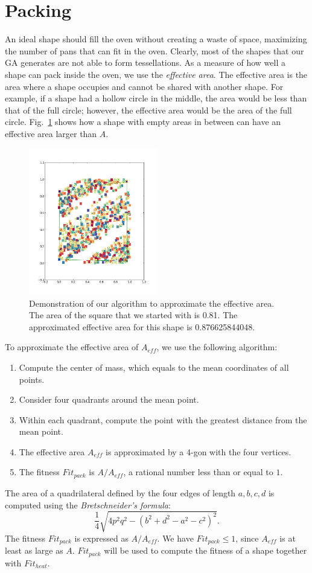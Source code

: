 \documentclass[12pt]{reedmcm}
\begin{document}
\section{Packing}
\label{sec:packing}
An ideal shape should fill the oven without creating a waste of space, maximizing the number of pans that can fit in the oven.
Clearly, most of the shapes that our GA generates are not able to form tessellations.
As a measure of how well a shape can pack inside the oven, we use the \textit{effective area}.
The effective area is the area where a shape occupies and cannot be shared with another shape.
For example, if a shape had a hollow circle in the middle, the area would be less than that of the full circle; however, the effective area would be the area of the full circle.
Fig.~\ref{fig:effarea} shows how a shape with empty areas in between can have an effective area larger than $A$.
\begin{figure}[h!]
  \centering
  \includegraphics[width=0.5\textwidth]{area_approx}
  \caption{Demonstration of our algorithm to approximate the effective area.
  The area of the square that we started with is 0.81.
  The approximated effective area for this shape is 0.876625844048.}
  \label{fig:effarea}
\end{figure}
%
To approximate the effective area of $A_{eff}$, we use the following algorithm:
\begin{enumerate}
  \item Compute the center of mass, which equals to the mean coordinates of all points.
  \item Consider four quadrants around the mean point.
  \item Within each quadrant, compute the point with the greatest distance from the mean point.
  \item The effective area $A_{eff}$ is approximated by a 4-gon with the four vertices.
  \item The fitness $Fit_{pack}$ is $A/A_{eff}$, a rational number less than or equal to $1$.
\end{enumerate}
The area of a quadrilateral defined by the four edges of length $a,b,c,d$ is computed using the \textit{Bretschneider's formula}:
\begin{equation*}
  \frac{1}{4}\sqrt{4p^2 q^2 - (b^2 + d^2 - a^2 - c^2)^2}.
\end{equation*}
The fitness $Fit_{pack}$ is expressed as $A/A_{eff}$.
We have $Fit_{pack} \leq 1$, since $A_{eff}$ is at least as large as $A$.
$Fit_{pack}$ will be used to compute the fitness of a shape together with $Fit_{heat}$.
\end{document}
